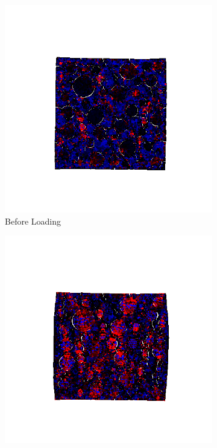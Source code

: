\begin{figure}[ht]
\centering

    \begin{subfigure}{.33\textwidth}
      \centering
      \includegraphics[width=1.0\linewidth]{Files/A30P75_3_IS/DEP50-STEP(020).png}
      \caption{Before Loading}
    \end{subfigure}%
    \begin{subfigure}{.33\textwidth}
      \centering
      \includegraphics[width=1.0\linewidth]{Files/A30P75_3_IS/DEP50-STEP(040).png}

\end{subfigure}
\end{figure}
